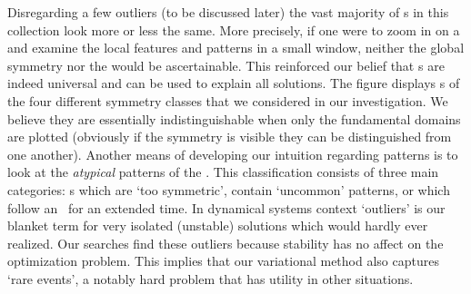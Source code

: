 Disregarding a few outliers (to be discussed later) the vast majority of {\po}s in this collection
look more or less the same. More precisely, if one were to zoom in on a {\po} and examine
the local features and patterns in a small {\spt} window, neither
the global {\spt} symmetry nor the {\extent} would be ascertainable. This reinforced our belief that {\fpo}s are indeed universal and
can be used to explain all solutions.
The figure %
displays {\po}s of the four different
{\spt} symmetry classes that we considered in our investigation. We believe they are essentially
indistinguishable when only the fundamental domains are plotted (obviously if the symmetry
is visible they can be distinguished from one another).%
Another means of developing our intuition regarding {\spt} patterns is
to look at the \textit{atypical} patterns of the \KSe.
This classification consists of three main categories: {\po}s which
are `too symmetric', contain `uncommon' patterns, or
which follow an \eqv\ for an extended time.
In dynamical systems context `outliers' is our blanket term for very isolated (unstable) solutions which would hardly ever realized.
Our searches find these outliers
because stability has no affect on the optimization problem.
This implies that our variational method also captures
`rare events', a notably hard problem that has utility in other situations. 

